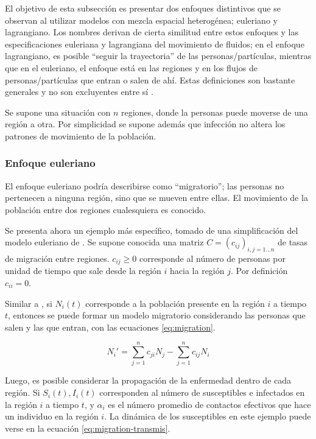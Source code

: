 El objetivo de esta subsección es presentar dos enfoques distintivos que se observan al utilizar modelos con mezcla espacial heterogénea; euleriano y lagrangiano. Los nombres derivan de cierta similitud entre estos enfoques y las especificaciones euleriana y lagrangiana del movimiento de fluidos; en el enfoque lagrangiano, es posible ``seguir la trayectoria'' de las personas/partículas, mientras que en el euleriano, el enfoque está en las regiones y en los flujos de personas/partículas que entran o salen de ahí. Estas definiciones son bastante generales y no son excluyentes entre sí \cite{Cosner2009}.

Se supone una situación con \(n\) regiones, donde la personas puede moverse de una región a otra. Por simplicidad se supone además que infección no altera los patrones de movimiento de la población.\\


\subsubsection*{Enfoque euleriano}

El enfoque euleriano podría describirse como ``migratorio''; las personas no pertenecen a ninguna región, sino que se mueven entre ellas. El movimiento de la población entre dos regiones cualesquiera es conocido.

Se presenta ahora un ejemplo más específico, tomado de una simplificación del modelo euleriano de \cite{Hsieh2007}. Se supone conocida una matriz \(C = (c_{ij})_{i, j = 1\dots n}\) de tasas de migración entre regiones.  \(c_{ij} \geq 0\) corresponde al número de personas por unidad de tiempo que sale desde la región \(i\) hacia la región \(j\). Por definición \(c_{ii} = 0\). 


Similar a \cite{Cosner2009}, si \(N_i(t)\) corresponde a la población presente en la región \(i\) a tiempo \(t\), entonces se puede formar un modelo migratorio considerando las personas que salen y las que entran, con las ecuaciones \ref{eq:migration}.

\begin{equation}\label{eq:migration}
N_i' = \sum_{j = 1}^n c_{ji} N_j - \sum_{j = 1}^n c_{ij} N_i
\end{equation}

Luego, es posible considerar la propagación de la enfermedad dentro de cada región. Si \(S_{i}(t), I_i(t)\) corresponden al número de susceptibles e infectados en la región \(i\) a tiempo \(t\), y \(\alpha_{i}\) es el número promedio de contactos efectivos que hace un individuo en la región \(i\). La dinámica de los susceptibles en este ejemplo puede verse en la ecuación \ref{eq:migration-transmis}.

